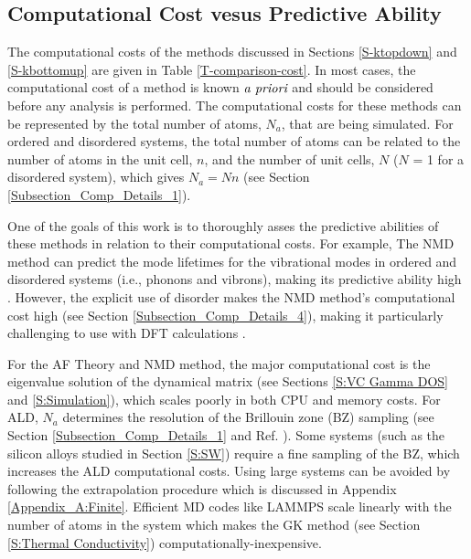 \subsection{\label{S-CompCost}
Computational Cost vesus Predictive Ability}

The computational costs of the methods discussed in Sections 
\ref{S-ktopdown} and \ref{S-kbottomup}  
are given in Table \ref{T-comparison-cost}.  
In most cases, the 
computational cost of a method is known $\emph{a priori}$ and should 
be considered before any analysis is performed. The computational 
costs for these methods can be represented by the total number of 
atoms, $N_a$, that are being simulated. 
For ordered and disordered 
systems, the total 
number of atoms can be related to the number of atoms in the unit 
cell, $n$, and the 
number of unit cells, $N$ ($N$ = 1 for a disordered system), 
which gives $N_a = N n$ (see Section \ref{Subsection_Comp_Details_1}).

One of the goals 
of this work is to thoroughly asses the predictive 
abilities of these methods in relation to their computational costs. 
For example, 
The NMD method can predict the mode lifetimes for the vibrational 
modes in ordered and disordered systems (i.e., phonons and vibrons), 
making its predictive ability high 
\cite{ladd_lattice_1986,mcgaughey_quantitative_2004,donadio_thermal_2007,
henry_spectral_2008,donadio_atomistic_2009,turney_predicting_2009,
goicochea_thermal_2010,he_morphology_2011,he_thermal_2011,he_heat_2011,
he_lattice_2012,sosso_thermal_2012,qiu_molecular_2012,wang_mode-wise_2013}. 
However, the explicit use of disorder makes the NMD method's 
computational cost high (see Section \ref{Subsection_Comp_Details_4}), 
making it particularly challenging to use with DFT calculations 
\cite{koker_thermal_2009,huang_filler-reduced_2010,
huang_ab_2008,luo_molecular_2011,esfarjani_heat_2011,
shiomi_thermal_2011}. 

For the AF Theory and NMD method, the major computational cost is the 
eigenvalue solution of the dynamical matrix 
(see Sections \ref{S:VC Gamma DOS} and \ref{S:Simulation}), which scales 
poorly in both CPU and memory costs. 
For ALD, $N_a$ determines the resolution of the 
Brillouin zone (BZ) sampling (see Section \ref{Subsection_Comp_Details_1} 
and Ref. ). Some systems (such as 
the silicon alloys studied in Section \ref{S:SW}) 
require a fine sampling 
of the BZ, which increases the ALD computational costs. Using large 
systems can be avoided by following the extrapolation procedure 
which is discussed in Appendix \ref{Appendix_A:Finite}.
Efficient MD 
codes like LAMMPS
scale linearly with the number of atoms in 
the system which makes the GK method (see Section 
\ref{S:Thermal Conductivity}) 
computationally-inexpensive.
 
